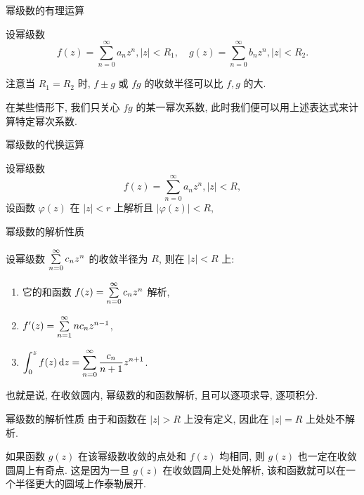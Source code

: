 \begin{frame}{幂级数的有理运算}
\onslide<+->
\begin{theorem}
设幂级数
\[f(z)=\sum_{n=0}^\infty a_nz^n,|z|<R_1,\quad
g(z)=\sum_{n=0}^\infty b_nz^n,|z|<R_2.\]
\end{theorem}
\onslide<+->
注意当 $R_1=R_2$ 时, $f\pm g$ 或 $fg$ 的收敛半径可以比 $f,g$ 的大.

\onslide<+->
在某些情形下, 我们只关心 $fg$ 的某一幂次系数,
\onslide<+->
此时我们便可以用上述表达式来计算特定幂次系数.
\end{frame}


\begin{frame}{幂级数的代换运算}
\onslide<+->
\begin{theorem}
设幂级数
\[f(z)=\sum_{n=0}^\infty a_nz^n,|z|<R,\]
设函数 $\varphi(z)$ 在 $|z|<r$ 上解析且 $|\varphi(z)|<R$, 
\end{theorem}
\end{frame}


\begin{frame}{幂级数的解析性质}
\onslide<+->
\begin{theorem}
设幂级数 $\sum\limits_{n=0}^\infty c_nz^n$ 的收敛半径为 $R$, 则在 $|z|<R$ 上:
\begin{enumerate}
\item 它的和函数 $f(z)=\sum\limits_{n=0}^\infty c_nz^n$ 解析,
\item $f'(z)=\sum\limits_{n=1}^\infty nc_nz^{n-1}$,
\item $\displaystyle\int_0^zf(z)\,\mathrm{d} z=\sum_{n=0}^\infty \frac{c_n}{n+1}z^{n+1}$.
\end{enumerate}
\end{theorem}
\onslide<+->
也就是说, \alert{在收敛圆内, 幂级数的和函数解析, 且可以逐项求导, 逐项积分}.
\end{frame}


\begin{frame}{幂级数的解析性质}
\onslide<+->
由于和函数在 $|z|>R$ 上没有定义, 因此在 $|z|=R$ 上处处不解析.

\onslide<+->
如果函数 $g(z)$ 在该幂级数收敛的点处和 $f(z)$ 均相同, 则 $g(z)$ 也\alert{一定在收敛圆周上有奇点}.
\onslide<+->
这是因为一旦 $g(z)$ 在收敛圆周上处处解析, 该和函数就可以在一个半径更大的圆域上作泰勒展开.
\end{frame}


